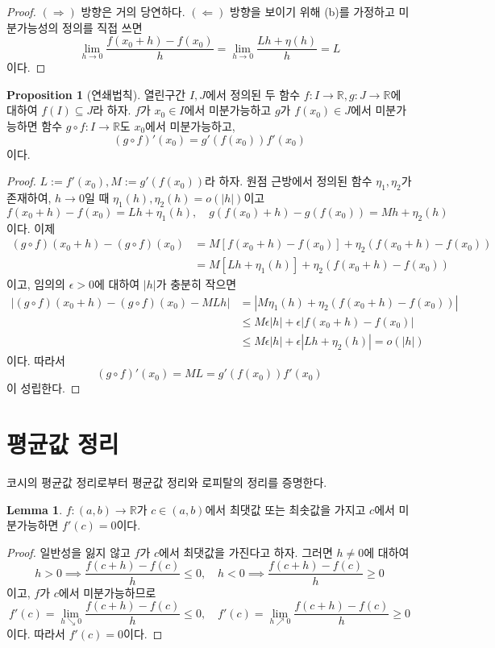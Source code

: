 \documentclass[11pt]{book}
\numberwithin{equation}{chapter}
\def\RR{\mathbb{R}}
\def\eps{\epsilon}
\newcommand{\abs}[1]{\left\vert#1\right\vert}
\theoremstyle{definition}
\newtheorem{lem}[thm]{Lemma}
\newtheorem{prop}[thm]{Proposition}
\begin{document}
\begin{proof}
    \quad \((\Rightarrow)\) 방향은 거의 당연하다. \((\Leftarrow)\) 방향을 보이기 위해 (b)를 가정하고 미분가능성의 정의를 직접 쓰면
    \[
    \lim_{h \to 0} \frac{f(x_0 + h) - f(x_0)}{h} = \lim_{h \to 0} \frac{L h + \eta(h)}{h} = L 
    \]
    이다.
\end{proof}

\begin{prop}[연쇄법칙]
    열린구간 \(I, J\)에서 정의된 두 함수 \(f : I \to \RR, g : J \to \RR\)에 대하여 \(f(I) \subseteq J\)라 하자. \(f\)가 \(x_0 \in I\)에서 미분가능하고 \(g\)가 \(f(x_0) \in J\)에서 미분가능하면 함수 \(g \circ f : I \to \RR\)도 \(x_0\)에서 미분가능하고,
    \[
    (g \circ f)'(x_0) = g'(f(x_0))f'(x_0)    
    \]
    이다.
\end{prop}
\begin{proof}
    \(L := f'(x_0), M := g'(f(x_0))\)라 하자. 원점 근방에서 정의된 함수 \(\eta_1, \eta_2\)가 존재하여, \(h \to 0\)일 때 \(\eta_1(h), \eta_2(h) = o(\abs{h})\)이고
    \[
    f(x_0 + h) - f(x_0) = L h + \eta_1(h), \quad g(f(x_0) + h) - g(f(x_0)) = M h + \eta_2(h)
    \]
    이다. 이제
    \begin{align*}
        (g \circ f)(x_0 + h) - (g \circ f)(x_0) &= M[f(x_0 + h) - f(x_0)] + \eta_2(f(x_0 + h) - f(x_0))\\
        &= M[Lh + \eta_1(h)] + \eta_2(f(x_0 + h) - f(x_0))
    \end{align*}
    이고, 임의의 \(\eps > 0\)에 대하여 \(\abs{h}\)가 충분히 작으면
    \begin{align*}
        \abs{(g \circ f)(x_0 + h) - (g \circ f)(x_0) - MLh} &= \abs{M\eta_1(h) + \eta_2(f(x_0 + h) - f(x_0))}\\
        &\le M\eps\abs{h} + \eps\abs{f(x_0+h) - f(x_0)}\\
        &\le M\eps\abs{h} + \eps\abs{Lh + \eta_2(h)} = o(\abs{h})
    \end{align*}
    이다. 따라서
    \[
        (g \circ f)'(x_0) = ML = g'(f(x_0))f'(x_0)
    \]
    이 성립한다.
\end{proof}

\section{평균값 정리}

코시의 평균값 정리로부터 평균값 정리와 로피탈의 정리를 증명한다.

\begin{lem} \label{lem 8.2.1}
    \(f : (a, b) \to \RR\)가 \(c \in (a, b)\)에서 최댓값 또는 최솟값을 가지고 \(c\)에서 미분가능하면 \(f'(c) = 0\)이다.
\end{lem}
\begin{proof}
    일반성을 잃지 않고 \(f\)가 \(c\)에서 최댓값을 가진다고 하자. 그러면 \(h \ne 0\)에 대하여
    \[
    h > 0 \implies \frac{f(c + h) - f(c)}{h} \le 0, \quad h < 0 \implies \frac{f(c + h) - f(c)}{h} \ge 0
    \]
    이고, \(f\)가 \(c\)에서 미분가능하므로
    \[
    f'(c) = \lim_{h \searrow 0} \frac{f(c + h) - f(c)}{h} \le 0, \quad  f'(c) = \lim_{h \nearrow 0} \frac{f(c + h) - f(c)}{h} \ge 0  
    \]
    이다. 따라서 \(f'(c) = 0\)이다. 
\end{proof}
\end{document}
